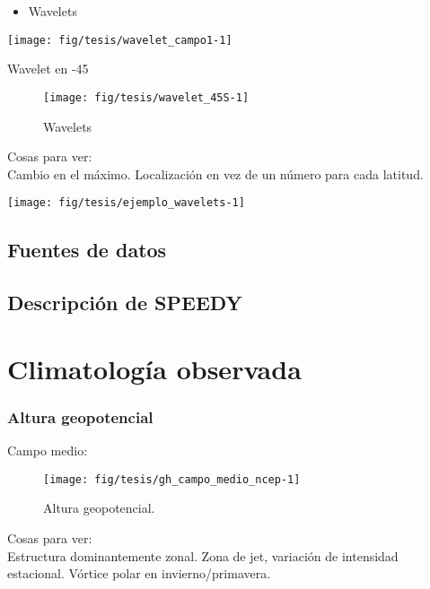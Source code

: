 \documentclass[es-AR,]{tufte-book}
\providecommand{\tightlist}{%
  \setlength{\itemsep}{0pt}\setlength{\parskip}{0pt}}
\begin{document}
\begin{itemize}
\tightlist
\item
  Wavelets
\end{itemize}

\texttt{[image: fig/tesis/wavelet\_campo1-1]}

Wavelet en -45

\begin{figure}
\texttt{[image: fig/tesis/wavelet\_45S-1]} \caption[Wavelets ]{Wavelets }\label{fig:wavelet_45S}
\end{figure}

Cosas para ver:\\
Cambio en el máximo. Localización en vez de un número para cada latitud.

\texttt{[image: fig/tesis/ejemplo\_wavelets-1]}

\section{Fuentes de datos}\label{fuentes-de-datos}

\section{Descripción de SPEEDY}\label{descripcion-de-speedy}

\chapter{Climatología observada}\label{climatologia-observada}

\subsection{Altura geopotencial}\label{altura-geopotencial}

Campo medio:

\begin{figure*}

{\centering \texttt{[image: fig/tesis/gh\_campo\_medio\_ncep-1]} 

}

\caption[Altura geopotencial]{Altura geopotencial.}\label{fig:gh_campo_medio_ncep}
\end{figure*}

Cosas para ver:\\
Estructura dominantemente zonal. Zona de jet, variación de intensidad
estacional. Vórtice polar en invierno/primavera.
\end{document}
